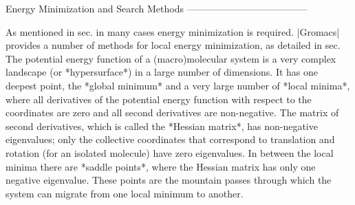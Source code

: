 Energy Minimization and Search Methods
--------------------------------------

As mentioned in sec.
in many cases
energy minimization is required. |Gromacs| provides a number of methods
for local energy minimization, as detailed in
sec.
The potential energy function of a (macro)molecular system is a very
complex landscape (or *hypersurface*) in a large number of dimensions.
It has one deepest point, the *global minimum* and a very large number
of *local minima*, where all derivatives of the potential energy
function with respect to the coordinates are zero and all second
derivatives are non-negative. The matrix of second derivatives, which is
called the *Hessian matrix*, has non-negative eigenvalues; only the
collective coordinates that correspond to translation and rotation (for
an isolated molecule) have zero eigenvalues. In between the local minima
there are *saddle points*, where the Hessian matrix has only one
negative eigenvalue. These points are the mountain passes through which
the system can migrate from one local minimum to another.

